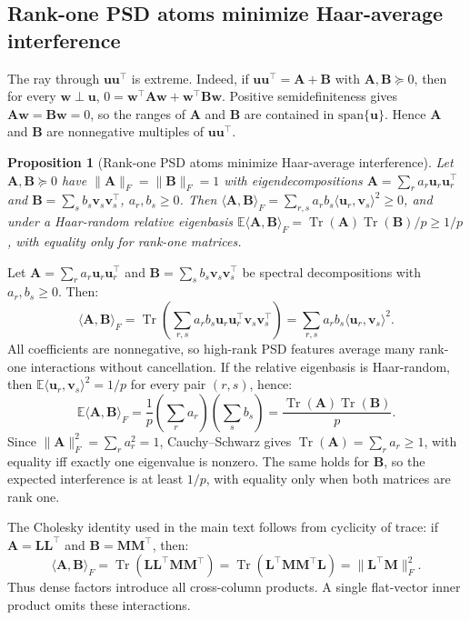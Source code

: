 \documentclass{article}
\newcommand{\1}{\bm{1}}
\newcommand{\norm}[1]{\lVert {#1} \rVert}
\newcommand{\lrangle}[1]{\langle#1\rangle}
\def\vu{{\bm{u}}}
\def\vv{{\bm{v}}}
\def\vw{{\bm{w}}}
\def\mA{{\bm{A}}}
\def\mB{{\bm{B}}}
\def\mL{{\bm{L}}}
\def\mM{{\bm{M}}}
\newcommand{\E}{\mathbb{E}}
\DeclareMathOperator{\Tr}{Tr}
\newtheorem{proposition}[theorem]{Proposition}
\theoremstyle{definition}
\begin{document}
\subsection{Rank-one PSD atoms minimize Haar-average interference}\label{app:rank-one-optimal}

The ray through $\vu\vu^\top$ is extreme. Indeed, if $\vu\vu^\top=\mA+\mB$ with $\mA,\mB\succeq0$,
then for every $\vw\perp\vu$, $0=\vw^\top\mA\vw+\vw^\top\mB\vw$. Positive semidefiniteness gives
$\mA\vw=\mB\vw=0$, so the ranges of $\mA$ and $\mB$ are contained in $\mathrm{span}\{\vu\}$. Hence
$\mA$ and $\mB$ are nonnegative multiples of $\vu\vu^\top$.

\begin{proposition}[Rank-one PSD atoms minimize Haar-average interference]
  \label{prop:spd-rank-one}
  Let $\mA,\mB\succeq 0$ have $\norm{\mA}_F=\norm{\mB}_F=1$ with eigendecompositions
  $\mA=\sum_r a_r\vu_r\vu_r^\top$ and $\mB=\sum_s b_s\vv_s\vv_s^\top$, $a_r,b_s\ge 0$. Then
  $\lrangle{\mA,\mB}_F=\sum_{r,s}a_r b_s\lrangle{\vu_r,\vv_s}^2\ge 0$, and under a Haar-random
  relative eigenbasis $\E\lrangle{\mA,\mB}_F=\Tr(\mA)\Tr(\mB)/p\ge 1/p$, with equality only for
  rank-one matrices.
\end{proposition}


Let $\mA=\sum_r a_r\vu_r\vu_r^\top$ and $\mB=\sum_s b_s\vv_s\vv_s^\top$ be spectral decompositions
with $a_r,b_s\ge0$. Then:
\[
  \lrangle{\mA,\mB}_F
  = \Tr\left(\sum_{r,s}a_r b_s\vu_r\vu_r^\top\vv_s\vv_s^\top\right)
  = \sum_{r,s}a_r b_s\lrangle{\vu_r,\vv_s}^2 .
\]
All coefficients are nonnegative, so high-rank PSD features average many rank-one interactions
without cancellation. If the relative eigenbasis is Haar-random, then
$\mathbb{E}\lrangle{\vu_r,\vv_s}^2=1/p$ for every pair $(r,s)$, hence:
\[
  \mathbb{E}\lrangle{\mA,\mB}_F
  = \frac{1}{p}\left(\sum_r a_r\right)\left(\sum_s b_s\right)
  = \frac{\Tr(\mA)\Tr(\mB)}{p}.
\]
Since $\norm{\mA}_F^2=\sum_r a_r^2=1$, Cauchy--Schwarz gives $\Tr(\mA)=\sum_r a_r\ge1$, with
equality iff exactly one eigenvalue is nonzero. The same holds for $\mB$, so the expected
interference is at least $1/p$, with equality only when both matrices are rank one.

The Cholesky identity used in the main text follows from cyclicity of trace: if $\mA=\mL\mL^\top$
and $\mB=\mM\mM^\top$, then:
\[
  \lrangle{\mA,\mB}_F
  = \Tr(\mL\mL^\top\mM\mM^\top)
  = \Tr(\mL^\top\mM\mM^\top\mL)
  = \norm{\mL^\top\mM}_F^2.
\]
Thus dense factors introduce all cross-column products. A single flat-vector inner product omits
these interactions.
\end{document}
